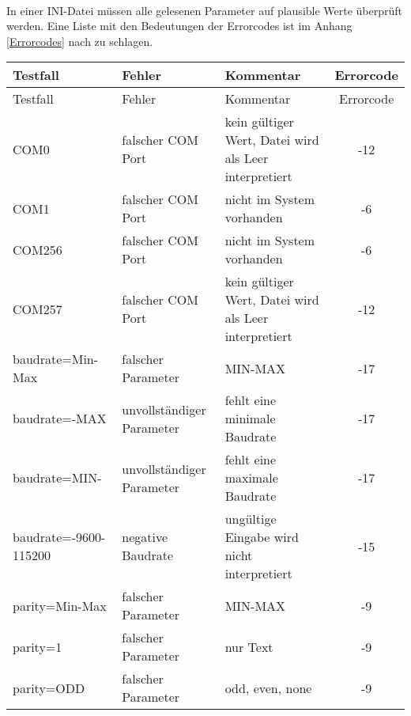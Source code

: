 \paragraph{}
In einer INI-Datei müssen alle gelesenen Parameter auf plausible Werte überprüft werden. Eine Liste mit den Bedeutungen der Errorcodes ist im Anhang \ref{Errorcodes} nach zu schlagen.
\begin{longtable}{||l|p{3cm}|p{5cm}|c||}
 


\hline
Testfall & Fehler & Kommentar & Errorcode \\ \hline\hline
\endfirsthead
\hline
Testfall & Fehler & Kommentar & Errorcode \\ \hline\hline
\endhead

COM0   & falscher COM Port & kein gültiger Wert, Datei wird als Leer interpretiert & -12\\ \hline
COM1   & falscher COM Port & nicht im System vorhanden                             & -6 \\ \hline
COM256 & falscher COM Port & nicht im System vorhanden                             & -6 \\ \hline
COM257 & falscher COM Port & kein gültiger Wert, Datei wird als Leer interpretiert & -12\\ \hline\hline

baudrate=Min-Max     & falscher Parameter        & MIN-MAX                      & -17 \\ \hline
baudrate=-MAX        & unvollständiger Parameter & fehlt eine minimale Baudrate & -17 \\ \hline
baudrate=MIN-        & unvollständiger Parameter & fehlt eine maximale Baudrate & -17 \\ \hline
baudrate=-9600-115200& negative Baudrate         & ungültige Eingabe wird nicht interpretiert &  -15\\ \hline

parity=Min-Max & falscher Parameter & MIN-MAX         & -9\\ \hline
parity=1       & falscher Parameter & nur Text & -9\\ \hline
parity=ODD     & falscher Parameter & odd, even, none & -9\\ \hline\hline


\end{longtable}
